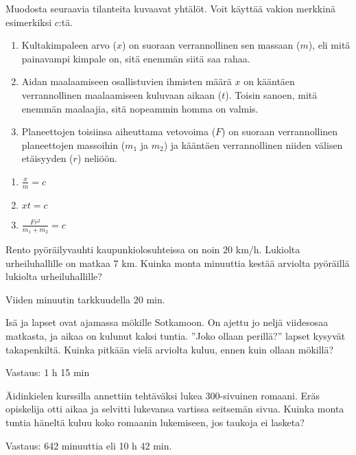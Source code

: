 \begin{tehtava}
Muodosta seuraavia tilanteita kuvaavat yhtälöt. Voit käyttää vakion
merkkinä esimerkiksi $c$:tä.
\begin{enumerate}
\item Kultakimpaleen arvo ($x$) on suoraan verrannollinen sen massaan ($m$),
eli mitä painavampi kimpale on, sitä enemmän siitä saa rahaa.
\item Aidan maalaamiseen osallistuvien ihmisten määrä {$x$} on kääntäen verrannollinen maalaamiseen kuluvaan aikaan ($t$). Toisin sanoen, mitä
enemmän maalaajia, sitä nopeammin homma on valmis.
\item Planeettojen toisiinsa aiheuttama vetovoima ($F$) on suoraan verrannollinen planeettojen massoihin ($m_1$ ja $m_2$) ja kääntäen verrannollinen niiden välisen etäisyyden ($r$) neliöön.
\end{enumerate}
\begin{vastaus}
\begin{enumerate}
\item $ \frac{x}{m}=c$
\item $ xt=c $
\item $ \frac{Fr^2}{m_1+m_2}=c$
\end{enumerate}
\end{vastaus}
\end{tehtava}

\begin{tehtava}
Rento pyöräilyvauhti kaupunkiolosuhteissa on noin $20$ km/h. Lukiolta urheiluhallille on matkaa $7$ km. Kuinka monta minuuttia kestää arviolta pyöräillä lukiolta urheiluhallille?
\begin{vastaus}
Viiden minuutin tarkkuudella $20$ min.
\end{vastaus}
\end{tehtava}

\begin{tehtava}
    Isä ja lapset ovat ajamassa mökille Sotkamoon. On ajettu jo neljä
    viidesosaa matkasta, ja aikaa on kulunut kaksi tuntia. ''Joko ollaan perillä?''
    lapset kysyvät takapenkiltä. Kuinka pitkään vielä arviolta kuluu, ennen
    kuin ollaan mökillä?
    
    \begin{vastaus}
        Vastaus: 1 h 15 min
    \end{vastaus}
\end{tehtava}

\begin{tehtava}
    Äidinkielen kurssilla annettiin tehtäväksi lukea 300-sivuinen romaani.
    Eräs opiskelija otti aikaa ja selvitti lukevansa vartissa seitsemän sivua.
    Kuinka monta tuntia häneltä kuluu koko romaanin lukemiseen, jos
    taukoja ei lasketa?
    
    \begin{vastaus}
        Vastaus: 642 minuuttia eli 10 h 42 min.
    \end{vastaus}
\end{tehtava}
